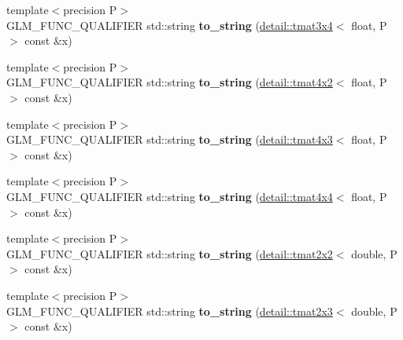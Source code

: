 \begin{DoxyCompactItemize}
\item 
\hypertarget{namespaceglm_aaad0b48ed82b5b2cdddeb76e3789abd1}{{\footnotesize template$<$precision P$>$ }\\G\-L\-M\-\_\-\-F\-U\-N\-C\-\_\-\-Q\-U\-A\-L\-I\-F\-I\-E\-R std\-::string {\bfseries to\-\_\-string} (\hyperlink{structglm_1_1detail_1_1tmat3x4}{detail\-::tmat3x4}$<$ float, P $>$ const \&x)}\label{namespaceglm_aaad0b48ed82b5b2cdddeb76e3789abd1}

\item 
\hypertarget{namespaceglm_ad10393d7027f19f386ff2cf7fa24ccfd}{{\footnotesize template$<$precision P$>$ }\\G\-L\-M\-\_\-\-F\-U\-N\-C\-\_\-\-Q\-U\-A\-L\-I\-F\-I\-E\-R std\-::string {\bfseries to\-\_\-string} (\hyperlink{structglm_1_1detail_1_1tmat4x2}{detail\-::tmat4x2}$<$ float, P $>$ const \&x)}\label{namespaceglm_ad10393d7027f19f386ff2cf7fa24ccfd}

\item 
\hypertarget{namespaceglm_aee13f0a6be949ae51bdc9488374b3182}{{\footnotesize template$<$precision P$>$ }\\G\-L\-M\-\_\-\-F\-U\-N\-C\-\_\-\-Q\-U\-A\-L\-I\-F\-I\-E\-R std\-::string {\bfseries to\-\_\-string} (\hyperlink{structglm_1_1detail_1_1tmat4x3}{detail\-::tmat4x3}$<$ float, P $>$ const \&x)}\label{namespaceglm_aee13f0a6be949ae51bdc9488374b3182}

\item 
\hypertarget{namespaceglm_a8603079aa7490861bd0d069fb9539ea4}{{\footnotesize template$<$precision P$>$ }\\G\-L\-M\-\_\-\-F\-U\-N\-C\-\_\-\-Q\-U\-A\-L\-I\-F\-I\-E\-R std\-::string {\bfseries to\-\_\-string} (\hyperlink{structglm_1_1detail_1_1tmat4x4}{detail\-::tmat4x4}$<$ float, P $>$ const \&x)}\label{namespaceglm_a8603079aa7490861bd0d069fb9539ea4}

\item 
\hypertarget{namespaceglm_a7d97d16b88df8cabe0fd352a3f7cbc67}{{\footnotesize template$<$precision P$>$ }\\G\-L\-M\-\_\-\-F\-U\-N\-C\-\_\-\-Q\-U\-A\-L\-I\-F\-I\-E\-R std\-::string {\bfseries to\-\_\-string} (\hyperlink{structglm_1_1detail_1_1tmat2x2}{detail\-::tmat2x2}$<$ double, P $>$ const \&x)}\label{namespaceglm_a7d97d16b88df8cabe0fd352a3f7cbc67}

\item 
\hypertarget{namespaceglm_a7d107a659954f00ea723ce93beef4d3f}{{\footnotesize template$<$precision P$>$ }\\G\-L\-M\-\_\-\-F\-U\-N\-C\-\_\-\-Q\-U\-A\-L\-I\-F\-I\-E\-R std\-::string {\bfseries to\-\_\-string} (\hyperlink{structglm_1_1detail_1_1tmat2x3}{detail\-::tmat2x3}$<$ double, P $>$ const \&x)}\label{namespaceglm_a7d107a659954f00ea723ce93beef4d3f}


\end{DoxyCompactItemize}
